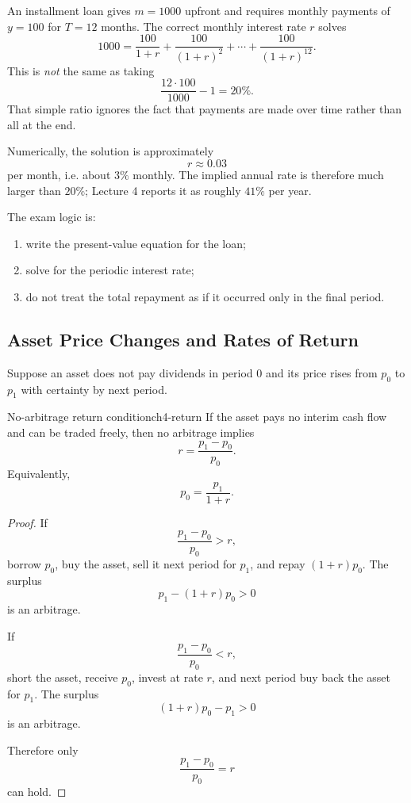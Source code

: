 \begin{examplebox}[title={Worked Example: installment loan interest rate}]
An installment loan gives $m=1000$ upfront and requires monthly payments of $y=100$ for $T=12$ months. The correct monthly interest rate $r$ solves
\[
1000
=
\frac{100}{1+r}
+
\frac{100}{(1+r)^2}
+\cdots+
\frac{100}{(1+r)^{12}}.
\]
This is \emph{not} the same as taking
\[
\frac{12\cdot 100}{1000}-1=20\%.
\]
That simple ratio ignores the fact that payments are made over time rather than all at the end.

Numerically, the solution is approximately
\[
r \approx 0.03
\]
per month, i.e. about $3\%$ monthly. The implied annual rate is therefore much larger than $20\%$; Lecture 4 reports it as roughly $41\%$ per year.

The exam logic is:
\begin{enumerate}
    \item write the present-value equation for the loan;
    \item solve for the periodic interest rate;
    \item do not treat the total repayment as if it occurred only in the final period.
\end{enumerate}
\end{examplebox}

\subsection{Asset Price Changes and Rates of Return}

Suppose an asset does not pay dividends in period 0 and its price rises from $p_0$ to $p_1$ with certainty by next period.

\begin{theorem}{No-arbitrage return condition}{ch4-return}
If the asset pays no interim cash flow and can be traded freely, then no arbitrage implies
\[
r=\frac{p_1-p_0}{p_0}.
\]
Equivalently,
\[
p_0=\frac{p_1}{1+r}.
\]
\end{theorem}

\begin{proof}
If
\[
\frac{p_1-p_0}{p_0}>r,
\]
borrow $p_0$, buy the asset, sell it next period for $p_1$, and repay $(1+r)p_0$. The surplus
\[
p_1-(1+r)p_0>0
\]
is an arbitrage.

If
\[
\frac{p_1-p_0}{p_0}<r,
\]
short the asset, receive $p_0$, invest at rate $r$, and next period buy back the asset for $p_1$. The surplus
\[
(1+r)p_0-p_1>0
\]
is an arbitrage.

Therefore only
\[
\frac{p_1-p_0}{p_0}=r
\]
can hold.
\end{proof}

